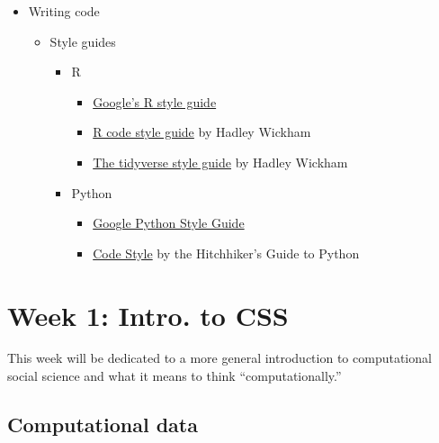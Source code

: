 \documentclass[
  letterpaper,
  DIV=11,
  numbers=noendperiod]{scrreprt}
\providecommand{\tightlist}{%
  \setlength{\itemsep}{0pt}\setlength{\parskip}{0pt}}\usepackage{longtable,booktabs,array}
\begin{document}
\begin{itemize}
\item
  Writing code

  \begin{itemize}
  \tightlist
  \item
    Style guides

    \begin{itemize}
    \tightlist
    \item
      R

      \begin{itemize}
      \tightlist
      \item
        \href{https://google.GitHub.io/styleguide/Rguide.xml}{Google's R
        style guide}
      \item
        \href{http://r-pkgs.had.co.nz/r.html}{R code style guide} by
        Hadley Wickham
      \item
        \href{http://style.tidyverse.org/}{The tidyverse style guide} by
        Hadley Wickham
      \end{itemize}
    \item
      Python

      \begin{itemize}
      \tightlist
      \item
        \href{https://GitHub.com/google/styleguide/blob/gh-pages/pyguide.md}{Google
        Python Style Guide}
      \item
        \href{https://docs.python-guide.org/writing/style/\#zen-of-python}{Code
        Style} by the Hitchhiker's Guide to Python
      \end{itemize}
    \end{itemize}
  \end{itemize}
\end{itemize}


\hypertarget{week-1-intro.-to-css}{%
\chapter{Week 1: Intro. to CSS}\label{week-1-intro.-to-css}}

This week will be dedicated to a more general introduction to
computational social science and what it means to think
``computationally.''

\hypertarget{computational-data}{%
\section{Computational data}\label{computational-data}}
\end{document}
